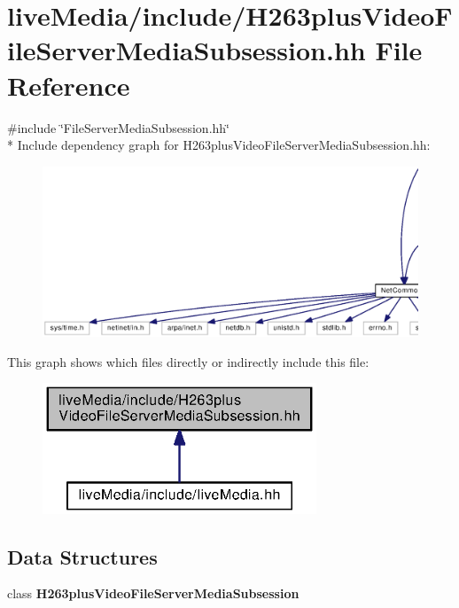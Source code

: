 \section{live\+Media/include/\+H263plus\+Video\+File\+Server\+Media\+Subsession.hh File Reference}
\label{H263plusVideoFileServerMediaSubsession_8hh}
{\ttfamily \#include \char`\"{}File\+Server\+Media\+Subsession.\+hh\char`\"{}}\\*
Include dependency graph for H263plus\+Video\+File\+Server\+Media\+Subsession.\+hh\+:
\nopagebreak
\begin{figure}[H]
\begin{center}
\leavevmode
\includegraphics[width=350pt]{H263plusVideoFileServerMediaSubsession_8hh__incl}
\end{center}
\end{figure}
This graph shows which files directly or indirectly include this file\+:
\nopagebreak
\begin{figure}[H]
\begin{center}
\leavevmode
\includegraphics[width=232pt]{H263plusVideoFileServerMediaSubsession_8hh__dep__incl}
\end{center}
\end{figure}
\subsection*{Data Structures}
\begin{DoxyCompactItemize}
\item 
class {\bf H263plus\+Video\+File\+Server\+Media\+Subsession}
\end{DoxyCompactItemize}
